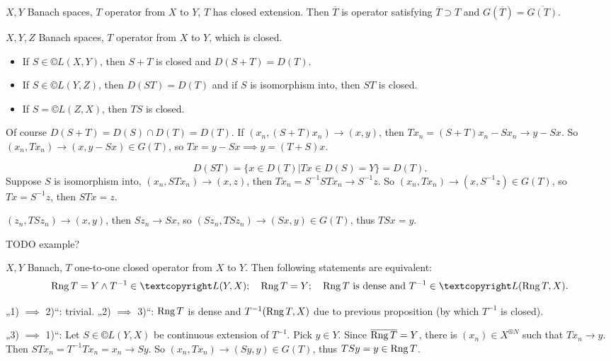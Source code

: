 \documentclass[12pt]{article}					%
\begin{document}
\begin{definice}
	$X, Y$ Banach spaces, $T$ operator from $X$ to $Y$, $T$ has closed extension. Then $\overline{T}$ is operator satisfying $\overline{T} \supset T$ and $G(\overline{T}) = \overline{G(T)}$.
\end{definice}

\begin{tvrzeni}
	$X, Y, Z$ Banach spaces, $T$ operator from $X$ to $Y$, which is closed.

	\begin{itemize}
		\item If $S \in ©L(X, Y)$, then $S + T$ is closed and $D(S + T) = D(T)$.
		\item If $S \in ©L(Y, Z)$, then $D(ST) = D(T)$ and if $S$ is isomorphism into, then $ST$ is closed.
		\item If $S = ©L(Z, X)$, then $TS$ is closed.
	\end{itemize}

	\begin{dukazin}
		Of course $D(S + T) = D(S) \cap D(T) = D(T)$. If $(x_n, (S + T) x_n) \rightarrow (x, y)$, then $T x_n = (S + T) x_n - S x_n \rightarrow y - Sx$. So $(x_n, T x_n) \rightarrow (x, y - S x) \in G(T)$, so $Tx = y - Sx \implies y = (T + S)x$.

		$$ D(ST) = \{x \in D(T) | Tx \in D(S) = Y\} = D(T). $$
		Suppose $S$ is isomorphism into, $(x_n, S Tx_n) \rightarrow (x, z)$, then $Tx_n = S^{-1}STx_n \rightarrow S^{-1}z$. So $(x_n, T x_n) \rightarrow (x, S^{-1} z) \in G(T)$, so $T x = S^{-1} z$, then $S T x = z$.

		$(z_n, T S z_n) \rightarrow (x, y)$, then $S z_n \rightarrow S x$, so $(S z_n, T S z_n) \rightarrow (S x, y) \in G(T)$, thus $T S x = y$.
	\end{dukazin}
\end{tvrzeni}


TODO example?

\begin{tvrzeni}
	$X, Y$ Banach, $T$ one-to-one closed operator from $X$ to $Y$. Then following statements are equivalent:\vspace{-0.8em}
	$$ \Rang T = Y \land T^{-1} \in ©L(Y, X); \quad \Rang T = Y; \quad \Rang T \text{ is dense and } T^{-1} \in ©L(\Rang T, X).\vspace{-1em} $$

	\begin{dukazin}
		„1) $\implies$ 2)“: trivial. „2) $\implies$ 3)“: $\operatorname{Rng} T$ is dense and $T^{-1}(\operatorname{Rng} T, X)$ due to previous proposition (by which $T^{-1}$ is closed).

		„3) $\implies$ 1)“: Let $S \in ©L(Y, X)$ be continuous extension of $T^{-1}$. Pick $y \in Y$. Since $\overline{\operatorname{Rng} T} = Y$, there is $(x_n) \in X^{®N}$ such that $T x_n \rightarrow y$. Then $S T x_n = T^{-1} T x_n = x_n \rightarrow S y$. So $(x_n, T x_n) \rightarrow (S y, y) \in G(T)$, thus $T S y = y \in \operatorname{Rng} T$.
	\end{dukazin}
\end{tvrzeni}
\end{document}
